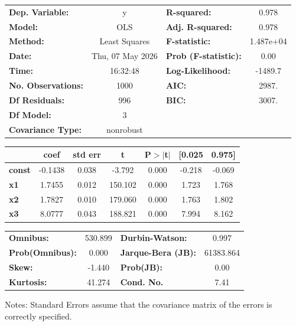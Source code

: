 \begin{center}
\begin{tabular}{lclc}
\toprule
\textbf{Dep. Variable:}    &        y         & \textbf{  R-squared:         } &     0.978   \\
\textbf{Model:}            &       OLS        & \textbf{  Adj. R-squared:    } &     0.978   \\
\textbf{Method:}           &  Least Squares   & \textbf{  F-statistic:       } & 1.487e+04   \\
\textbf{Date:}             & Thu, 07 May 2026 & \textbf{  Prob (F-statistic):} &     0.00    \\
\textbf{Time:}             &     16:32:48     & \textbf{  Log-Likelihood:    } &   -1489.7   \\
\textbf{No. Observations:} &        1000      & \textbf{  AIC:               } &     2987.   \\
\textbf{Df Residuals:}     &         996      & \textbf{  BIC:               } &     3007.   \\
\textbf{Df Model:}         &           3      & \textbf{                     } &             \\
\textbf{Covariance Type:}  &    nonrobust     & \textbf{                     } &             \\
\bottomrule
\end{tabular}
\begin{tabular}{lcccccc}
               & \textbf{coef} & \textbf{std err} & \textbf{t} & \textbf{P$> |$t$|$} & \textbf{[0.025} & \textbf{0.975]}  \\
\midrule
\textbf{const} &      -0.1438  &        0.038     &    -3.792  &         0.000        &       -0.218    &       -0.069     \\
\textbf{x1}    &       1.7455  &        0.012     &   150.102  &         0.000        &        1.723    &        1.768     \\
\textbf{x2}    &       1.7827  &        0.010     &   179.060  &         0.000        &        1.763    &        1.802     \\
\textbf{x3}    &       8.0777  &        0.043     &   188.821  &         0.000        &        7.994    &        8.162     \\
\bottomrule
\end{tabular}
\begin{tabular}{lclc}
\textbf{Omnibus:}       & 530.899 & \textbf{  Durbin-Watson:     } &     0.997  \\
\textbf{Prob(Omnibus):} &   0.000 & \textbf{  Jarque-Bera (JB):  } & 61383.864  \\
\textbf{Skew:}          &  -1.440 & \textbf{  Prob(JB):          } &      0.00  \\
\textbf{Kurtosis:}      &  41.274 & \textbf{  Cond. No.          } &      7.41  \\
\bottomrule
\end{tabular}
\end{center}

Notes: \newline
 [1] Standard Errors assume that the covariance matrix of the errors is correctly specified.